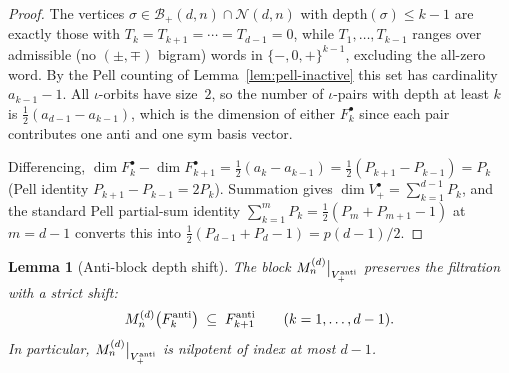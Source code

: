 \documentclass{amsart}
\newtheorem{lemma}[theorem]{Lemma}
\theoremstyle{definition}
\theoremstyle{remark}
\begin{document}
\begin{proof}
The vertices $\sigma \in \mathcal{B}_+(d, n) \cap \mathcal{N}(d, n)$
with $\mathrm{depth}(\sigma) \le k - 1$ are exactly those with
$T_k = T_{k+1} = \cdots = T_{d-1} = 0$, while $T_1, \ldots, T_{k-1}$
ranges over admissible (no $(\pm,\mp)$ bigram) words in
$\{-,0,+\}^{k-1}$, excluding the all-zero word.  By the Pell
counting of Lemma~\ref{lem:pell-inactive} this set has
cardinality $a_{k-1} - 1$.  All $\iota$-orbits have size~$2$,
so the number of $\iota$-pairs with depth at least $k$ is
$\tfrac12(a_{d-1} - a_{k-1})$, which is the dimension of either
$F_k^\bullet$ since each pair contributes one anti and one sym
basis vector.

Differencing, $\dim F_k^\bullet - \dim F_{k+1}^\bullet =
\tfrac12(a_k - a_{k-1}) = \tfrac12(P_{k+1} - P_{k-1}) = P_k$
(Pell identity $P_{k+1} - P_{k-1} = 2 P_k$).  Summation gives
$\dim V_+^\bullet = \sum_{k=1}^{d-1} P_k$, and the standard
Pell partial-sum identity $\sum_{k=1}^{m} P_k =
\tfrac12(P_m + P_{m+1} - 1)$ at $m = d-1$ converts this into
$\tfrac12(P_{d-1} + P_d - 1) = p(d-1)/2$.
\end{proof}

\begin{lemma}[Anti-block depth shift]\label{lem:depth-shift-anti}
The block $M_n^{(d)}\big|_{V_+^{\rm anti}}$ preserves the
filtration with a strict shift:
\begin{equation}\label{eq:depth-shift-anti}
  M_n^{(d)}\bigl(F_k^{\rm anti}\bigr) \;\subseteq\;
  F_{k+1}^{\rm anti} \qquad (k = 1, \ldots, d-1).
\end{equation}
In particular, $M_n^{(d)}\big|_{V_+^{\rm anti}}$ is nilpotent
of index at most $d-1$.
\end{lemma}
\end{document}
